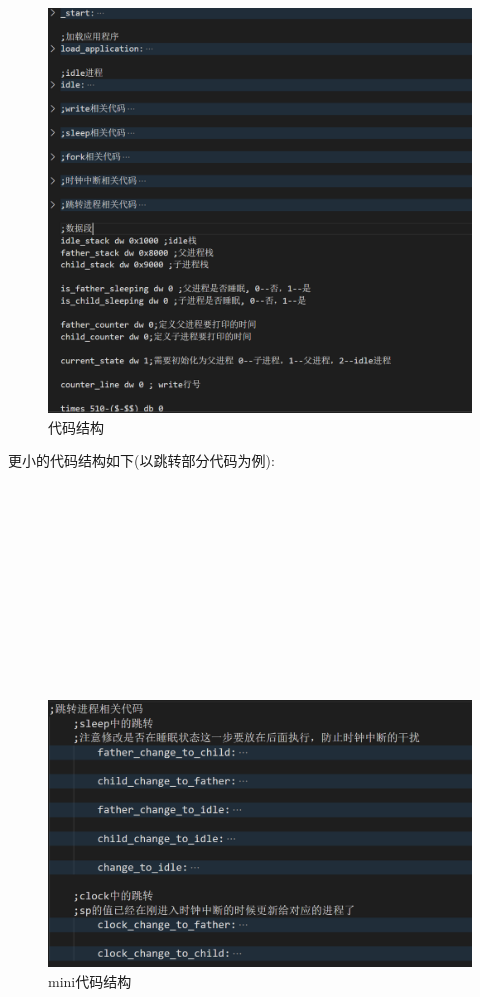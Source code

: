 \documentclass{LabReport}
\begin{document}
\begin{figure}[h!]
	\centering
	\includegraphics[width=0.7\linewidth]{figures/structure}
	\caption{代码结构}
\end{figure}

	更小的代码结构如下(以跳转部分代码为例):\newline\\\\\\\\\\\\\\\\\\\\\\\\
\begin{figure}[h!]
	\centering
	\includegraphics[width=0.7\linewidth]{figures/mini_structure}
	\caption{mini代码结构}
\end{figure}
\end{document}
